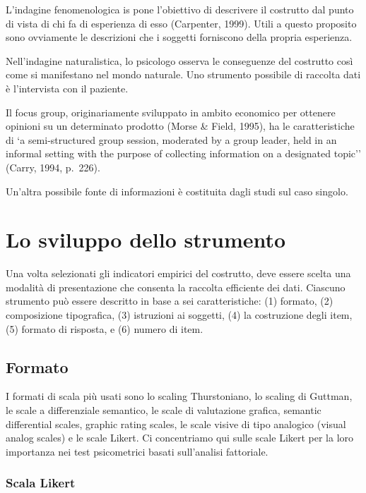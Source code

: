 \documentclass[
  11pt,
]{krantz}
\theoremstyle{definition}
\theoremstyle{definition}
\theoremstyle{definition}
\theoremstyle{definition}
\theoremstyle{remark}
\begin{document}
L'indagine fenomenologica is pone l'obiettivo di descrivere il costrutto dal punto di vista di chi fa di esperienza di esso (Carpenter, 1999). Utili a questo proposito sono ovviamente le descrizioni che i soggetti forniscono della propria esperienza.

Nell'indagine naturalistica, lo psicologo osserva le conseguenze del costrutto così come si manifestano nel mondo naturale. Uno strumento possibile di raccolta dati è l'intervista con il paziente.

Il focus group, originariamente sviluppato in ambito economico per ottenere opinioni su un determinato prodotto (Morse \& Field, 1995), ha le caratteristiche di `a semi-structured group session, moderated by a group leader, held in an informal setting with the purpose of collecting information on a designated topic'' (Carry, 1994, p.~226).

Un'altra possibile fonte di informazioni è costituita dagli studi sul caso singolo.

\hypertarget{lo-sviluppo-dello-strumento}{%
\section{Lo sviluppo dello strumento}\label{lo-sviluppo-dello-strumento}}

Una volta selezionati gli indicatori empirici del costrutto, deve essere scelta una modalità di presentazione che consenta la raccolta efficiente dei dati. Ciascuno strumento può essere descritto in base a sei caratteristiche: (1) formato, (2) composizione tipografica, (3) istruzioni ai soggetti, (4) la costruzione degli item, (5) formato di risposta, e (6) numero di item.

\hypertarget{formato}{%
\subsection{Formato}\label{formato}}

I formati di scala più usati sono lo scaling Thurstoniano, lo scaling di Guttman, le scale a differenziale semantico, le scale di valutazione grafica, semantic differential scales, graphic rating scales, le scale visive di tipo analogico (visual analog scales) e le scale Likert. Ci concentriamo qui sulle scale Likert per la loro importanza nei test psicometrici basati sull'analisi fattoriale.

\hypertarget{scala-likert}{%
\subsubsection{Scala Likert}\label{scala-likert}}
\end{document}
